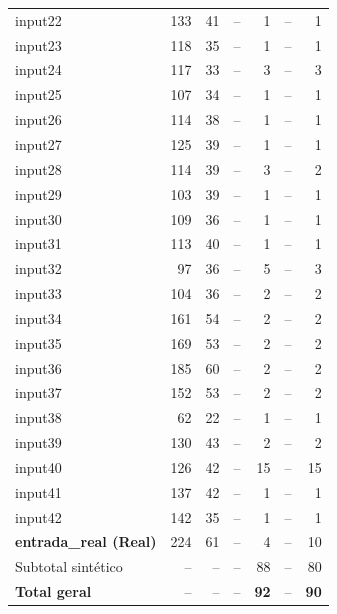 \begin{longtable}{@{}lrrrrrr@{}}
input22 & 133 & 41 & -- & 1 & -- & 1 \\
input23 & 118 & 35 & -- & 1 & -- & 1 \\
input24 & 117 & 33 & -- & 3 & -- & 3 \\
input25 & 107 & 34 & -- & 1 & -- & 1 \\
input26 & 114 & 38 & -- & 1 & -- & 1 \\
input27 & 125 & 39 & -- & 1 & -- & 1 \\
input28 & 114 & 39 & -- & 3 & -- & 2 \\
input29 & 103 & 39 & -- & 1 & -- & 1 \\
input30 & 109 & 36 & -- & 1 & -- & 1 \\
input31 & 113 & 40 & -- & 1 & -- & 1 \\
input32 & 97 & 36 & -- & 5 & -- & 3 \\
input33 & 104 & 36 & -- & 2 & -- & 2 \\
input34 & 161 & 54 & -- & 2 & -- & 2 \\
input35 & 169 & 53 & -- & 2 & -- & 2 \\
input36 & 185 & 60 & -- & 2 & -- & 2 \\
input37 & 152 & 53 & -- & 2 & -- & 2 \\
input38 & 62 & 22 & -- & 1 & -- & 1 \\
input39 & 130 & 43 & -- & 2 & -- & 2 \\
input40 & 126 & 42 & -- & 15 & -- & 15 \\
input41 & 137 & 42 & -- & 1 & -- & 1 \\
input42 & 142 & 35 & -- & 1 & -- & 1 \\
\rowcolor{realrow} \textbf{entrada\_real (Real)} & 224 & 61 & -- & 4 & -- & 10 \\
\midrule
Subtotal sintético & -- & -- & -- & 88 & -- & 80 \\
\textbf{Total geral} & -- & -- & -- & \textbf{92} & -- & \textbf{90} \\
\end{longtable}
\endgroup
